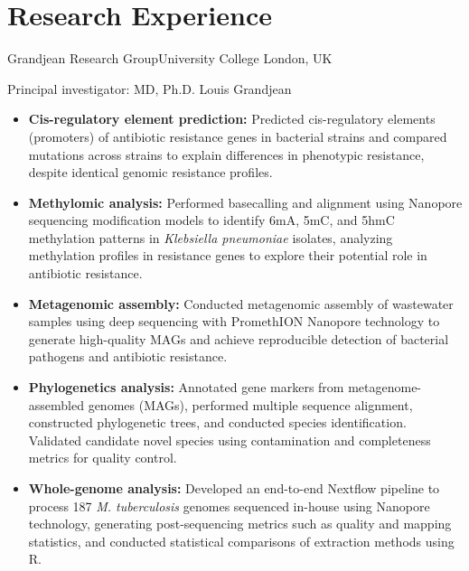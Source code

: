 \documentclass[11pt,a4paper,sans]{moderncv}
\begin{document}
\section{Research Experience}
  {Grandjean Research Group}{University College London, UK}{}
  {Principal investigator: MD, Ph.D. Louis Grandjean
  \begin{itemize}%
    \item \textbf{Cis-regulatory element prediction:} Predicted cis-regulatory elements (promoters) of antibiotic resistance genes in bacterial strains and compared mutations across strains to explain differences in phenotypic resistance, despite identical genomic resistance profiles.
    \item \textbf{Methylomic analysis:} Performed basecalling and alignment using Nanopore sequencing modification models to identify 6mA, 5mC, and 5hmC methylation patterns in \textit{Klebsiella pneumoniae} isolates, analyzing methylation profiles in resistance genes to explore their potential role in antibiotic resistance.
    \item \textbf{Metagenomic assembly:} Conducted metagenomic assembly of wastewater samples using deep sequencing with PromethION Nanopore technology to generate high-quality MAGs and achieve reproducible detection of bacterial pathogens and antibiotic resistance.
    \item \textbf{Phylogenetics analysis:} Annotated gene markers from metagenome-assembled genomes (MAGs), performed multiple sequence alignment, constructed phylogenetic trees, and conducted species identification. Validated candidate novel species using contamination and completeness metrics for quality control. 
    \item \textbf{Whole-genome analysis:} Developed an end-to-end Nextflow pipeline to process 187 \textit{M. tuberculosis} genomes sequenced in-house using Nanopore technology, generating post-sequencing metrics such as quality and mapping statistics, and conducted statistical comparisons of extraction methods using R.
  \end{itemize}
  }
\end{document}
